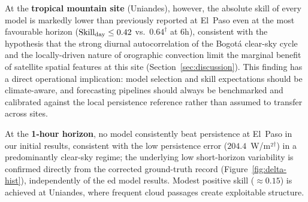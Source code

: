 At the \textbf{tropical mountain site} (Uniandes), however, the absolute skill
of every model is markedly lower than previously reported at El~Paso even at
the most favourable horizon ($\text{Skill}_\text{day} \leq 0.42$ vs.\ $0.64^\dagger$ at 6h),
consistent with the
hypothesis that the strong diurnal autocorrelation of the Bogot{\'a}
clear-sky cycle and the locally-driven nature of orographic convection limit
the marginal benefit of satellite spatial features at this site
(Section~\ref{sec:discussion}). This finding has a direct operational
implication: model selection and skill expectations should be climate-aware,
and forecasting pipelines should always be benchmarked and calibrated against
the local persistence reference rather than assumed to transfer across sites.

At the \textbf{1-hour horizon}, no model consistently beat persistence at
El~Paso in our initial results, consistent with the low persistence error
($204.4$~W/m²$^\dagger$) in a predominantly
clear-sky regime; the underlying low short-horizon variability is confirmed
directly from the corrected ground-truth record (Figure~\ref{fig:delta-hist}),
independently of the \dag ed model results. Modest positive skill ($\approx 0.15$)
is achieved at Uniandes, where frequent cloud passages create exploitable structure.

